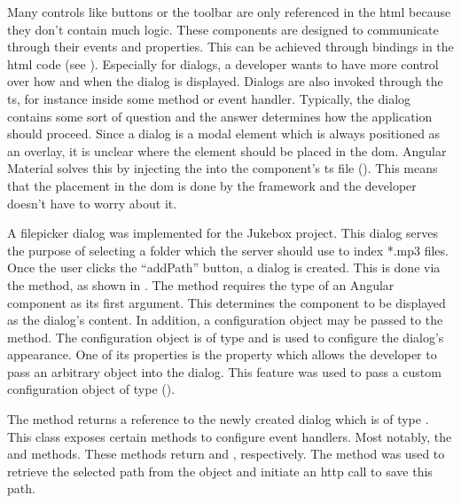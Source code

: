 Many controls like buttons or the toolbar are only referenced in the \gls{html} because they don't contain much logic. These components are designed to communicate through their events and properties. This can be achieved through bindings in the \gls{html} code (see ). Especially for dialogs, a developer wants to have more control over how and when the dialog is displayed. Dialogs are also invoked through the \gls{ts}, for instance inside some method or event handler. Typically, the dialog contains some sort of question and the answer determines how the application should proceed. Since a dialog is a modal element which is always positioned as an overlay, it is unclear where the element should be placed in the \gls{dom}. Angular Material solves this by injecting the  into the component's \gls{ts} file (). This means that the placement in the \gls{dom} is done by the framework and the developer doesn't have to worry about it.

A filepicker dialog was implemented for the Jukebox project. This dialog serves the purpose of selecting a folder which the server should use to index *.mp3 files. Once the user clicks the \enquote{addPath} button, a dialog is created. This is done via the  method, as shown in . The  method requires the type of an Angular component as its first argument. This determines the component to be displayed as the dialog's content. In addition, a configuration object may be passed to the method. The configuration object is of type  and is used to configure the dialog's appearance. One of its properties is the  property which allows the developer to pass an arbitrary object into the dialog. This feature was used to pass a custom configuration object of type  ().


The  method returns a reference to the newly created dialog which is of type . This class exposes certain methods to configure event handlers. Most notably, the  and  methods. These methods return  and , respectively. The  method was used to retrieve the selected path from the  object and initiate an \gls{http} call to save this path.

